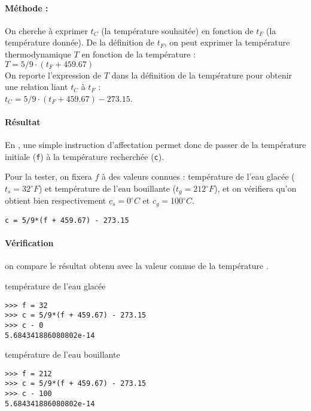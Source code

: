 \paragraph{Méthode :} On cherche à exprimer $t_C$ (la température souhaitée)
en fonction de $t_F$ (la température donnée).
De la définition de $t_F$, on peut exprimer la température thermodynamique $T$
en fonction de la température  :\\
$T = 5/9\cdot(t_F + 459.67)$\\
On reporte l'expression de $T$ dans la définition de la température  pour obtenir
une relation liant $t_C$ à $t_F$ :\\
$t_C = 5/9\cdot(t_F + 459.67) - 273.15$. 
\vspace*{2mm}

\noindent
\begin{minipage}[t]{7cm}
\paragraph{Résultat} En \python, une simple instruction d'affectation permet 
donc de passer de la température  initiale (\texttt{f}) à 
la température  recherchée (\texttt{c}).

Pour la tester, on fixera $f$ à des valeurs connues : température de l'eau glacée 
($t_s = 32^{\circ}F$) et température de l'eau bouillante 
($t_g = 212^{\circ}F$), et on vérifiera qu'on obtient bien respectivement 
$c_s = 0^{\circ}C$ et $c_g = 100^{\circ}C$.
\end{minipage}
\hfill
\begin{minipage}[t]{8cm}
\begin{lstlisting}
c = 5/9*(f + 459.67) - 273.15
\end{lstlisting}
\end{minipage}

\paragraph{Vérification} on compare le résultat obtenu avec la valeur connue
de la température .
			
\begin{minipage}[t]{7cm}\footnotesize
température de l'eau glacée
\begin{Verbatim}
>>> f = 32
>>> c = 5/9*(f + 459.67) - 273.15
>>> c - 0
5.684341886080802e-14
\end{Verbatim}
\end{minipage}
\hfill
\begin{minipage}[t]{7cm}\footnotesize
température de l'eau bouillante
\begin{Verbatim}
>>> f = 212
>>> c = 5/9*(f + 459.67) - 273.15
>>> c - 100
5.684341886080802e-14
\end{Verbatim}
\end{minipage}
\vspace*{2mm}

